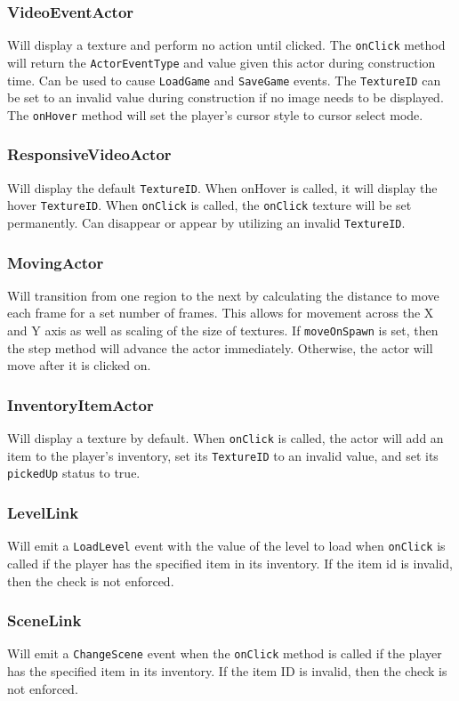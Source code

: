\documentclass{article}
\begin{document}
    \subsubsection{VideoEventActor}
    Will display a texture and perform no action until clicked. The \texttt{onClick} method will return the \texttt{ActorEventType} and value given this actor during construction time. Can be used to cause \texttt{LoadGame} and \texttt{SaveGame} events. The \texttt{TextureID} can be set to an invalid value during construction if no image needs to be displayed. The \texttt{onHover} method will set the player's cursor style to cursor select mode.
    \subsubsection{ResponsiveVideoActor}
    Will display the default \texttt{TextureID}. When onHover is called, it will display the hover \texttt{TextureID}. When \texttt{onClick} is called, the \texttt{onClick} texture will be set permanently. Can disappear or appear by utilizing an invalid \texttt{TextureID}.
    \subsubsection{MovingActor}
    Will transition from one region to the next by calculating the distance to move each frame for a set number of frames. This allows for movement across the X and Y axis as well as scaling of the size of textures. If \texttt{moveOnSpawn} is set, then the step method will advance the actor immediately. Otherwise, the actor will move after it is clicked on.
    \subsubsection{InventoryItemActor}
    Will display a texture by default. When \texttt{onClick} is called, the actor will add an item to the player's inventory, set its \texttt{TextureID} to an invalid value, and set its \texttt{pickedUp} status to true.
    \subsubsection{LevelLink}
    Will emit a \texttt{LoadLevel} event with the value of the level to load when \texttt{onClick} is called if the player has the specified item in its inventory. If the item id is invalid, then the check is not enforced.
    \subsubsection{SceneLink}
    Will emit a \texttt{ChangeScene} event when the \texttt{onClick} method is called if the player has the specified item in its inventory. If the item ID is invalid, then the check is not enforced.
\end{document}
